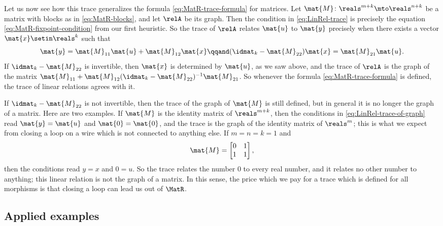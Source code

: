 Let us now see how this trace generalizes the formula \cref{eq:MatR-trace-formula} for matrices.
Let $\mat{M} \colon \reals^{m+k} \mto \reals^{n+k}$ be a matrix with blocks as in \cref{eq:MatR-blocks}, and let $\relA$ be its graph.
Then the condition in \cref{eq:LinRel-trace} is precisely the equation \cref{eq:MatR-fixpoint-condition} from our first heuristic.
So the trace of $\relA$ relates $\mat{u}$ to $\mat{y}$ precisely when there exists a vector $\mat{x} \setin \reals^k$ such that
\begin{equation}
    \label{eq:LinRel-trace-of-graph}
    \mat{y} = \mat{M}_{11} \mat{u} + \mat{M}_{12} \mat{x}
    \qqand
    (\idmat_k - \mat{M}_{22}) \mat{x} = \mat{M}_{21} \mat{u}.
\end{equation}
If $\idmat_k - \mat{M}_{22}$ is invertible, then $\mat{x}$ is determined by $\mat{u}$, as we saw above, and the trace of $\relA$ is the graph of the matrix $\mat{M}_{11} + \mat{M}_{12} (\idmat_k - \mat{M}_{22})^{-1} \mat{M}_{21}$.
So whenever the formula \cref{eq:MatR-trace-formula} is defined, the trace of linear relations agrees with it.

If $\idmat_k - \mat{M}_{22}$ is not invertible, then the trace of the graph of $\mat{M}$ is still defined, but in general it is no longer the graph of a matrix.
Here are two examples.
If $\mat{M}$ is the identity matrix of $\reals^{m+k}$, then the conditions in \cref{eq:LinRel-trace-of-graph} read $\mat{y} = \mat{u}$ and $\mat{0} = \mat{0}$, and the trace is the graph of the identity matrix of $\reals^m$; this is what we expect from closing a loop on a wire which is not connected to anything else.
If $m = n = k = 1$ and
\begin{equation}
    \mat{M} =
    \begin{bmatrix}
        0 & 1 \\
        1 & 1
    \end{bmatrix},
\end{equation}
then the conditions read $y = x$ and $0 = u$.
So the trace relates the number $0$ to every real number, and it relates no other number to anything; this linear relation is not the graph of a matrix.
In this sense, the price which we pay for a trace which is defined for all morphisms is that closing a loop can lead us out of $\MatR$.




\subsection{Applied examples}

